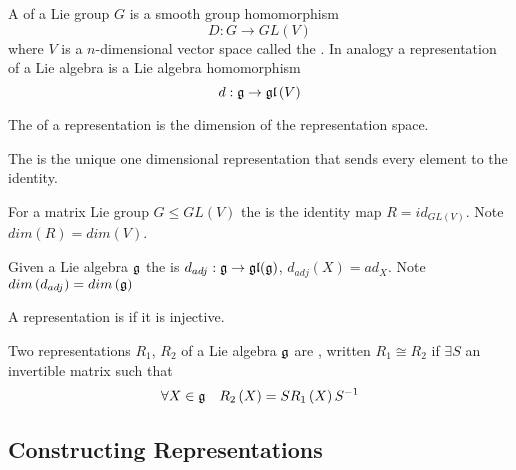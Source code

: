 \documentclass{article}
\begin{document}
\begin{definition}[Representations]
A  of a Lie group $G$ is a smooth group homomorphism 
\[
D:G\to GL\left(V\right)
\]
where $V$ is a $n$-dimensional vector space called the .
In analogy a representation of a Lie algebra is a Lie algebra homomorphism 
\[
d:\mathfrak{g} \to \mathfrak{gl}\left(V\right)
\]
\end{definition}

\begin{definition}[Dimension]
The  of a representation is the dimension of the representation space.
\end{definition}

\begin{definition} 
The  is the unique one dimensional representation that sends every element to the identity. 
\end{definition}

\begin{definition}
For a matrix Lie group $G\leq GL(V)$ the  is the identity map $R=id_{GL(V)}$. Note $dim\left(R\right)=dim\left(V\right)$.
\end{definition}

\begin{definition}
Given a Lie algebra $\mathfrak{g}$ the  is $d_{adj}:\mathfrak{g}\to\mathfrak{gl}(\mathfrak{g})$, $d_{adj}\left(X\right)=ad_X $. Note $dim\left(d_{adj}\right)=dim\left(\mathfrak{g}\right)$
\end{definition}

\begin{definition}
A representation is  if it is injective. 
\end{definition}

\begin{definition}
Two representations $R_1$, $R_2$ of a Lie algebra $\mathfrak{g}$ are , written $R_1 \cong R_2$ if $\exists S$ an invertible matrix such that 
\[
\forall X\in\mathfrak{g} \quad R_2\left(X\right)=S R_1\left(X\right) S^{-1}
\]
\end{definition}



\subsection{Constructing Representations}
\end{document}
